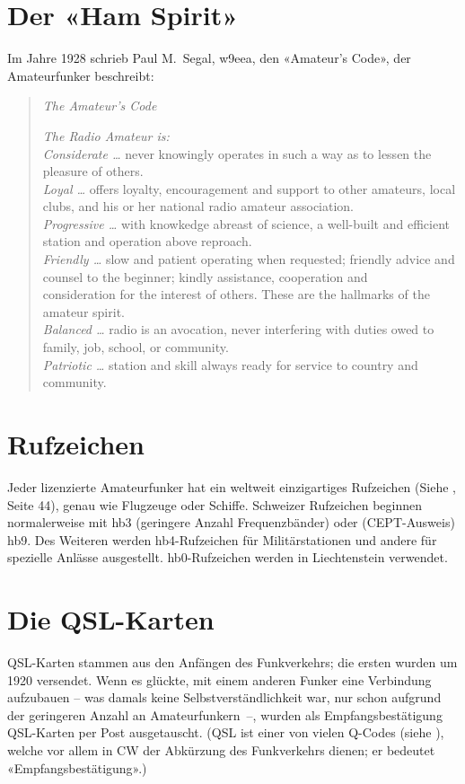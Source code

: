 \section{Der «Ham Spirit»}
Im Jahre 1928 schrieb Paul M.~Segal, w9eea, den «Amateur's Code», der Amateurfunker beschreibt:

\begin{quotation}
\textit{The Amateur's Code}

\vspace{1em}
\noindent
\textit{The Radio Amateur is:}\\
\textit{Considerate …} never knowingly operates in such a way as to lessen the pleasure of others. \\
\textit{Loyal …} offers loyalty, encouragement and support to other amateurs, local clubs, and his or her national radio amateur association. \\
\textit{Progressive …} with knowkedge abreast of science, a well-built and efficient station and operation above reproach. \\
\textit{Friendly …} slow and patient operating when requested; friendly advice and counsel to the beginner; kindly assistance, cooperation and \\ consideration for the interest of others. These are the hallmarks of the amateur spirit. \\
\textit{Balanced …} radio is an avocation, never interfering with duties owed to family, job, school, or community. \\
\textit{Patriotic …} station and skill always ready for service to country and community.
 
\end{quotation}


\section{Rufzeichen}
Jeder lizenzierte Amateurfunker hat ein weltweit einzigartiges Rufzeichen (Siehe , Seite 44), genau wie Flugzeuge oder Schiffe. Schweizer Rufzeichen beginnen normalerweise mit hb3 (geringere Anzahl Frequenzbänder) oder (CEPT-Ausweis) hb9. Des Weiteren werden hb4-Rufzeichen für Militärstationen und andere für spezielle Anlässe ausgestellt. hb0-Rufzeichen werden in Liechtenstein verwendet.

\section{Die QSL-Karten}\label{sec:qsl}
QSL-Karten stammen aus den Anfängen des Funkverkehrs; die ersten wurden um 1920 versendet. Wenn es glückte, mit einem anderen Funker eine Verbindung aufzubauen -- was damals keine Selbstverständlichkeit war, nur schon aufgrund der geringeren Anzahl an Amateurfunkern~--, wurden als Empfangsbestätigung QSL-Karten per Post ausgetauscht. (QSL ist einer von vielen Q-Codes (siehe ), welche vor allem in CW der Abkürzung des Funkverkehrs dienen; er bedeutet «Empfangsbestätigung».)

